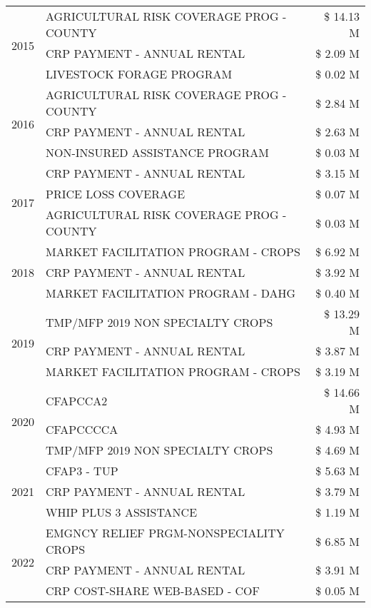 \begin{tabular}{llr}
\multirow[t]{3}{*}{2015} & AGRICULTURAL RISK COVERAGE PROG - COUNTY & \$ 14.13 M \\
 & CRP PAYMENT - ANNUAL RENTAL & \$ 2.09 M \\
 & LIVESTOCK FORAGE PROGRAM & \$ 0.02 M \\
\cline{1-3}
\multirow[t]{3}{*}{2016} & AGRICULTURAL RISK COVERAGE PROG - COUNTY & \$ 2.84 M \\
 & CRP PAYMENT - ANNUAL RENTAL & \$ 2.63 M \\
 & NON-INSURED ASSISTANCE PROGRAM & \$ 0.03 M \\
\cline{1-3}
\multirow[t]{3}{*}{2017} & CRP PAYMENT - ANNUAL RENTAL & \$ 3.15 M \\
 & PRICE LOSS COVERAGE & \$ 0.07 M \\
 & AGRICULTURAL RISK COVERAGE PROG - COUNTY & \$ 0.03 M \\
\cline{1-3}
\multirow[t]{3}{*}{2018} & MARKET FACILITATION PROGRAM - CROPS & \$ 6.92 M \\
 & CRP PAYMENT - ANNUAL RENTAL & \$ 3.92 M \\
 & MARKET FACILITATION PROGRAM - DAHG & \$ 0.40 M \\
\cline{1-3}
\multirow[t]{3}{*}{2019} & TMP/MFP 2019 NON SPECIALTY CROPS & \$ 13.29 M \\
 & CRP PAYMENT - ANNUAL RENTAL & \$ 3.87 M \\
 & MARKET FACILITATION PROGRAM - CROPS & \$ 3.19 M \\
\cline{1-3}
\multirow[t]{3}{*}{2020} & CFAPCCA2 & \$ 14.66 M \\
 & CFAPCCCCA & \$ 4.93 M \\
 & TMP/MFP 2019 NON SPECIALTY CROPS & \$ 4.69 M \\
\cline{1-3}
\multirow[t]{3}{*}{2021} & CFAP3 - TUP & \$ 5.63 M \\
 & CRP PAYMENT - ANNUAL RENTAL & \$ 3.79 M \\
 & WHIP PLUS 3 ASSISTANCE & \$ 1.19 M \\
\cline{1-3}
\multirow[t]{3}{*}{2022} & EMGNCY RELIEF PRGM-NONSPECIALITY CROPS & \$ 6.85 M \\
 & CRP PAYMENT - ANNUAL RENTAL & \$ 3.91 M \\
 & CRP COST-SHARE WEB-BASED - COF & \$ 0.05 M \\
\cline{1-3}
\bottomrule
\end{tabular}
